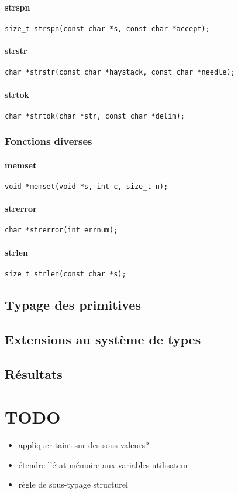 \paragraph{strspn}
\begin{Verbatim}
size_t strspn(const char *s, const char *accept);
\end{Verbatim}
\paragraph{strstr}
\begin{Verbatim}
char *strstr(const char *haystack, const char *needle);
\end{Verbatim}
\paragraph{strtok}
\begin{Verbatim}
char *strtok(char *str, const char *delim);
\end{Verbatim}

\subsubsection{Fonctions diverses}

\paragraph{memset}
\begin{Verbatim}
void *memset(void *s, int c, size_t n);
\end{Verbatim}
\paragraph{strerror}
\begin{Verbatim}
char *strerror(int errnum);
\end{Verbatim}
\paragraph{strlen}
\begin{Verbatim}
size_t strlen(const char *s);
\end{Verbatim}

\subsection{Typage des primitives}

\subsection{Extensions au système de types}

\subsection{Résultats}%

\section*{TODO}

\begin{itemize}
\item appliquer taint sur des sous-valeurs?
\item étendre l'état mémoire aux variables utilisateur
\item règle de sous-typage structurel
\end{itemize}

